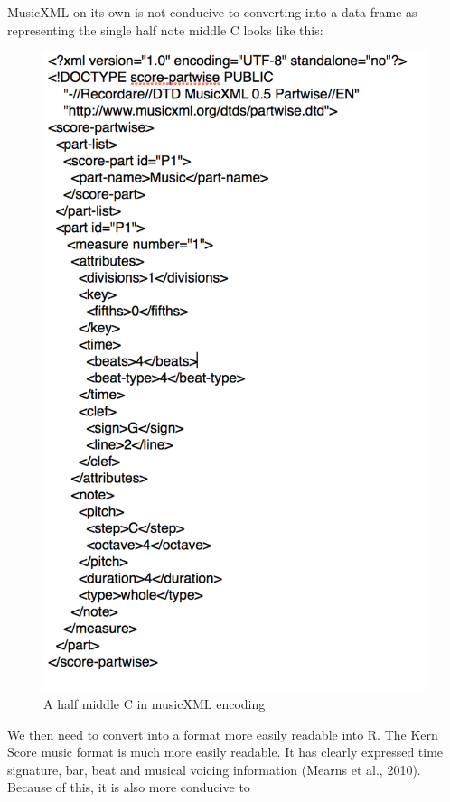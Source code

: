 \documentclass[12pt,twoside]{reedthesis}
\theoremstyle{definition}
\theoremstyle{definition}
\theoremstyle{definition}
\theoremstyle{remark}
\begin{document}
MusicXML on its own is not conducive to converting into a data frame as
representing the single half note middle C looks like this:
\begin{figure}[h]
\centering
\includegraphics[scale=.4]{images/mxlc.png}
\caption{A half middle C in musicXML encoding}
\label{subd}
\end{figure}
We then need to convert into a format more easily readable into R. The
Kern Score music format is much more easily readable. It has clearly
expressed time signature, bar, beat and musical voicing information
(Mearns et al., 2010). Because of this, it is also more conducive to
\end{document}
